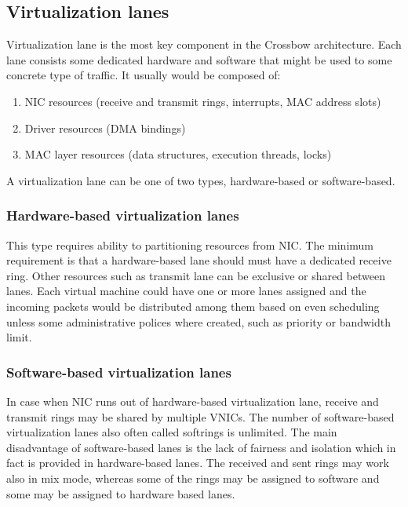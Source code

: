 \documentclass[11pt]{book}
\begin{document}
		
      \subsection{Virtualization lanes}

        Virtualization lane is the most key component in the Crossbow architecture. Each lane consists some dedicated
        hardware and software that might be used to some concrete type of traffic. It usually would be composed of: 

        \begin{enumerate}
          \item NIC resources (receive and transmit rings, interrupts, MAC address slots)
          \item Driver resources (DMA bindings)
          \item MAC layer resources (data structures, execution threads, locks)
        \end{enumerate}
        
        A virtualization lane can be one of two types, hardware-based or software-based.

        
        \subsubsection{Hardware-based virtualization lanes}
        
          This type requires ability to partitioning resources from NIC. The minimum requirement is that a
          hardware-based lane should must have a dedicated receive ring.  Other resources such as transmit lane can be
          exclusive or shared between lanes. Each virtual machine could have one or more lanes assigned and the incoming
          packets would be distributed among them based on even scheduling unless some administrative polices where
          created, such as priority or bandwidth limit.		

        
        \subsubsection{Software-based virtualization lanes}
        
          In case when NIC runs out of hardware-based virtualization lane, receive and transmit rings may be shared by
          multiple VNICs. The number of software-based virtualization lanes also often called softrings is unlimited.
          The main disadvantage of software-based lanes is the lack of fairness and isolation which in fact is provided
          in hardware-based lanes. The received and sent rings may work also in mix mode, whereas some of the rings may
          be assigned to software and some may be assigned to hardware based lanes.	
			
\end{document}
